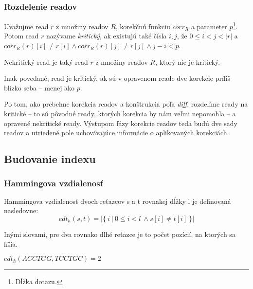 \subsubsection{Rozdelenie readov}
\begin{defn}
Uvažujme read $r$ z množiny readov $R$, korekčnú funkciu $corr_R$ a parameter $p$\footnote{Dĺžka dotazu.}. Potom read $r$ nazývame \emph{kritický}, ak existujú také čísla $i, j$, že $0 \leq i < j < |r|$ a $corr_R(r)[i] \neq r[i] \wedge corr_R(r)[j] \neq r[j] \wedge j - i < p$.
\end{defn}

\begin{pozn}
Nekritický read je taký read $r$ z množiny readov $R$, ktorý nie je kritický.
\end{pozn}

Inak povedané, read je kritický, ak sú v opravenom reade dve korekcie príliš blízko seba -- menej ako $p$.

Po tom, ako prebehne korekcia readov a konštrukcia poľa \emph{diff}, rozdelíme ready na kritické -- to sú pôvodné ready, ktorých korekcia by nám veľmi nepomohla -- a opravené nekritické ready. Výstupom fázy korekcie readov teda budú dve sady readov a utriedené pole uchovávajúce informácie o aplikovaných korekciách.

\subsection{Budovanie indexu}
\label{ssec:budovanie_indexu}
\subsubsection{Hammingova vzdialenosť}
\begin{defn}
Hammingova vzdialenosť dvoch reťazcov s a t rovnakej dĺžky l je definovaná nasledovne:
$$
edt_h(s, t) = \left\vert{ \{~i~|~0 \leq i < l~\land s[i] \neq t[i] ~\} }\right\vert
$$
\end{defn}

Inými slovami, pre dva rovnako dlhé reťazce je to počet pozícií, na ktorých sa líšia.

\begin{example}
$edt_h(ACCTGG, TCCTGC) = 2$ 
\end{example}

